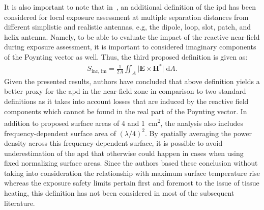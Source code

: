 It is also important to note that in~\cite{Christ2020Limitations}, an additional definition of the \gls{ipd} has been considered for local exposure assessment at multiple separation distances from different simplistic and realistic antennas, e.g, the dipole, loop, slot, patch, and helix antenna.
Namely, to be able to evaluate the impact of the reactive near-field during exposure assessment, it is important to considered imaginary components of the Poynting vector as well.
Thus, the third proposed definition is given as:
\begin{align}
    S_\text{inc, im} = \frac{1}{2A} \iint_A \big| \mathbf{E} \times \mathbf{H}^* \big| \; \mathrm{d}A.
\end{align}
Given the presented results, authors have concluded that above definition yields a better proxy for the \gls{apd} in the near-field zone in comparison to two standard definitions as it takes into account losses that are induced by the reactive field components which cannot be found in the real part of the Poynting vector.
In addition to proposed surface areas of \SI{4}{} and \SI{1}{\cm\squared}, the analysis also includes frequency-dependent surface area of $(\lambda / 4)^2$.
By spatially averaging the power density across this frequency-dependent surface, it is possible to avoid underestimation of the \gls{apd} that otherwise could happen in cases when using fixed normalizing surface areas.
Since the authors based these conclusion without taking into consideration the relationship with maximum surface temperature rise whereas the exposure safety limits pertain first and foremost to the issue of tissue heating, this definition has not been considered in most of the subsequent literature.

